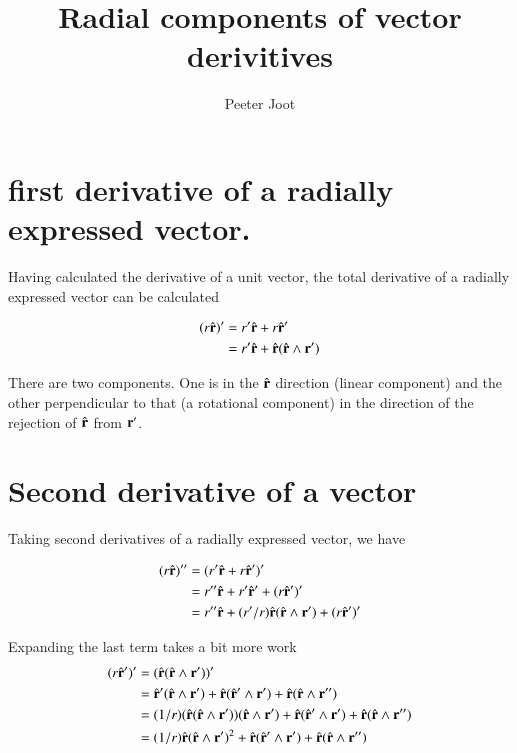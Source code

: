 \documentclass{article}      %
\title{Radial components of vector derivitives} %
\author{Peeter Joot}         %
\newcommand{\BrPrimeRej}[0]{\rcap(\rcap \wedge \Br')}
\begin{document}

\maketitle{}

\section{first derivative of a radially expressed vector.}

Having calculated the derivative of a unit vector, the total 
derivative of a radially expressed vector can be calculated

\begin{align*}
(r\rcap)'  
   &= r'\rcap  + r\rcap' \\
   &= r'\rcap  + \BrPrimeRej \\
\end{align*}

There are two components.  One is in the $\hat{\mathbf{r}}$ direction (linear component)
and the other perpendicular to that (a rotational component) in the direction of the rejection
of $\hat{\mathbf{r}}$ from $\mathbf{r}'$.

\section{Second derivative of a vector}

Taking second derivatives of a radially expressed vector, we have

\begin{align*}
(r\rcap)'' 
   &= (r'\rcap + r{\rcap}')' \\
   &= r''\rcap + r'\rcap' + (r\rcap')' \\
   &= r''\rcap + (r'/r)\BrPrimeRej + (r\rcap')' \\
\end{align*}

Expanding the last term takes a bit more work
\begin{align*}
(r\rcap')' 
   &= (\BrPrimeRej)' \\
   &= 
\rcap'(\rcap \wedge \Br') +
\rcap(\rcap' \wedge \Br') +
\rcap(\rcap \wedge \Br'') \\
   &= 
(1/r)(\BrPrimeRej)(\rcap \wedge \Br') +
\rcap(\rcap' \wedge \Br') +
\rcap(\rcap \wedge \Br'') \\
   &= 
(1/r)\rcap(\rcap \wedge \Br')^2 +
\rcap(\rcap' \wedge \Br') +
\rcap(\rcap \wedge \Br'') \\
\end{align*}
\end{document}
